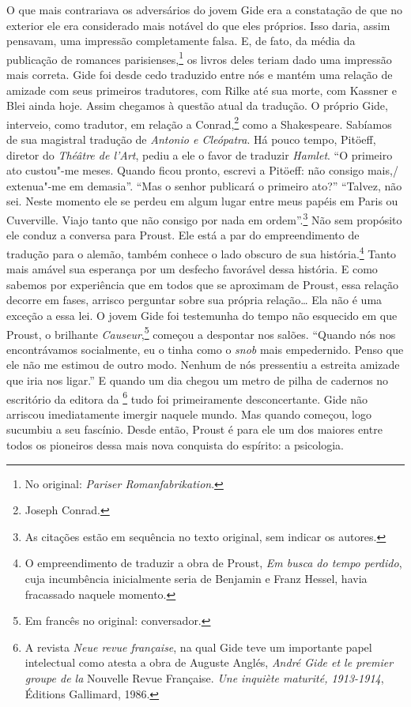 O que mais contrariava os adversários do jovem Gide era a constatação de
que no exterior ele era considerado mais notável do que eles próprios.
Isso daria, assim pensavam, uma impressão completamente falsa. E, de
fato, da média da publicação de romances parisienses,\footnote{No
  original: \emph{Pariser Romanfabrikation}. \versal{[N. T.]}} os livros deles teriam dado uma impressão mais correta. Gide foi
desde cedo traduzido entre nós e mantém uma relação de amizade com seus
primeiros tradutores, com Rilke até sua morte, com Kassner e Blei ainda
hoje. Assim chegamos à questão atual da tradução. O próprio Gide,
interveio, como tradutor, em relação a Conrad,\footnote{Joseph
  Conrad. \versal{[N. E.]}} como a Shakespeare. Sabíamos de sua magistral tradução de
\emph{Antonio e Cleópatra}. Há pouco tempo, Pitöeff, diretor do
\emph{Théâtre de l'Art}, pediu a ele o favor de traduzir \emph{Hamlet}.
``O primeiro ato custou"-me meses. Quando ficou pronto, escrevi a
Pitöeff: não consigo mais,/ extenua"-me em demasia''. ``Mas o senhor
publicará o primeiro ato?'' ``Talvez, não sei. Neste momento ele se
perdeu em algum lugar entre meus papéis em Paris ou Cuverville. Viajo
tanto que não consigo por nada em ordem''.\footnote{As citações
  estão em sequência no texto original, sem indicar os autores. \versal{[N. T.]}} Não sem propósito ele conduz a conversa para Proust. Ele está a
par do empreendimento de tradução para o alemão, também conhece o lado
obscuro de sua história.\footnote{O empreendimento de traduzir a
  obra de Proust, \emph{Em busca do tempo perdido}, cuja incumbência
  inicialmente seria de Benjamin e Franz Hessel, havia fracassado
  naquele momento. \versal{[N. T.]}} Tanto mais amável sua esperança por um desfecho
favorável dessa história. E como sabemos por experiência que em todos
que se aproximam de Proust, essa relação decorre em fases, arrisco
perguntar sobre sua própria relação\ldots{} Ela não é uma exceção a essa lei.
O jovem Gide foi testemunha do tempo não esquecido em que Proust, o
brilhante \emph{Causeur},\footnote{Em francês no original: conversador. \versal{[N. T.]}} começou
a despontar nos salões. ``Quando nós nos encontrávamos socialmente, eu o
tinha como o \emph{snob} mais empedernido. Penso que ele não me
estimou de outro modo. Nenhum de nós pressentiu a estreita amizade que
iria nos ligar.'' E quando um dia chegou um metro de pilha de cadernos
no escritório da editora da \footnote{A revista
  \emph{Neue revue française}, na qual Gide teve um importante papel
  intelectual como atesta a obra de Auguste Anglés, \emph{André Gide et
  le premier groupe de la} Nouvelle Revue Française. \emph{Une inquiète
  maturité, 1913-1914}, Éditions Gallimard, 1986. \versal{[N. T.]}} tudo foi
primeiramente desconcertante. Gide não arriscou imediatamente imergir
naquele mundo. Mas quando começou, logo sucumbiu a seu fascínio. Desde
então, Proust é para ele um dos maiores entre todos os pioneiros dessa
mais nova conquista do espírito: a psicologia.

